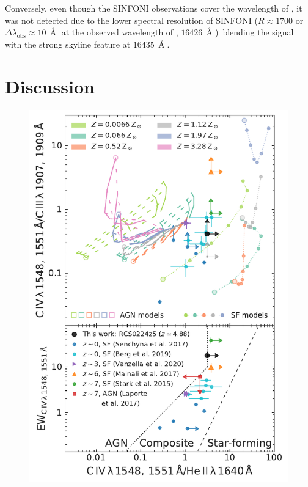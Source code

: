 Conversely, even though the SINFONI observations cover the wavelength of \MgII, it was not detected due to the lower spectral resolution of SINFONI ($R \approx 1700$ or $\Delta \lambda_\text{obs} \approx 10 \, \Angstrom$ at the observed wavelength of \MgII, $16426 \, \Angstrom$)\ blending the signal with the strong skyline feature at $16435 \, \Angstrom$.

\section{Discussion}
\label{chAsec:Discussion}
\begin{figure}
    \centering
    \includegraphics[width=0.6\linewidth]{"Plots/ChapterA/Line_ratios_CIV-HeII"}

\end{figure}
